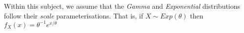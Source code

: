 
\begin{note}[Parameterisation]
    Within this subject, we assume that the \textit{Gamma} and \textit{Exponential} distributions follow their \textit{scale} parameterisations. That is, if $X\sim Exp(\theta)$ then 
    $f_X(x) = \theta^{-1} e^{x/\theta}$
\end{note}